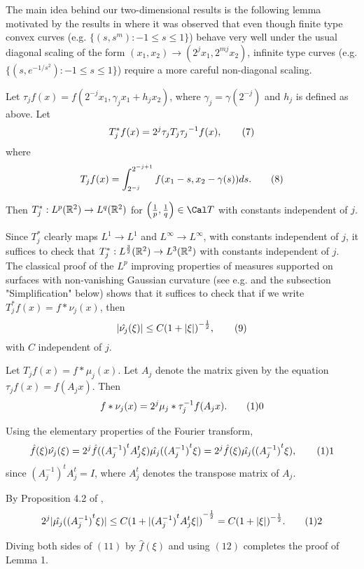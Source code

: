 The main idea behind our two-dimensional results is the following lemma 
motivated by the results in \cite{CCVWW89} where it was observed that 
even though finite type convex curves (e.g. $\{(s, s^m): -1 \leq s \leq 1\}$) 
behave very well under the usual diagonal scaling of the form 
$(x_1,x_2) \rightarrow
(2^jx_1, 2^{mj}x_2)$, infinite type curves (e.g. $\{(s, e^{-1/s^2}): 
-1 \leq s \leq 1\}$) require a more careful non-diagonal scaling.  

 Let $\tau_jf(x)=f(2^{-j}x_1, \gamma_jx_1+h_jx_2)$, 
where $\gamma_j=\gamma(2^{-j})$ and $h_j$ is defined as above. Let 
$$ T^{*}_jf(x)=2^j \tau_j T_j {\tau_j}^{-1}f(x), \tag7$$ where 
$$ T_jf(x)=\int_{2^{-j}}^{2^{-j+1}} f(x_1-s, x_2-\gamma(s))ds. \tag8$$ 

Then $T^{*}_j:L^p({\Bbb R}^2) \rightarrow L^q({\Bbb R}^2)$ for 
$\left(\frac{1}{p}, \frac{1}{q} \right)\in {\Cal T}$ with constants 
independent of $j$.
\endproclaim 

Since $T^{*}_j$ clearly maps $L^1 \rightarrow L^1$ and 
$L^{\infty} \rightarrow L^{\infty}$, with constants independent of $j$, 
it suffices to check that $T^{*}_j: L^{\frac{3}{2}}({\Bbb R}^2) \rightarrow
L^3({\Bbb R}^2)$ with constants independent of $j$. The classical proof 
of the $L^p$ improving properties of measures supported on surfaces with
non-vanishing Gaussian curvature (see e.g. \cite{Str70} and the subsection 
"Simplification" below) shows that it 
suffices to check that if we write $T^{*}_jf(x)=f*\nu_j(x)$, then 
$$ |\hat{\nu_j}(\xi)| \leq C{(1+|\xi|)}^{-\frac{1}{2}}, \tag9$$ with 
$C$ independent of $j$. \enddemo  

Let $T_jf(x)=f*\mu_j(x)$. Let $A_j$ denote the matrix given by the 
equation $\tau_jf(x)=f(A_jx)$. Then
$$ f*\nu_j(x)=2^j \mu_j*\tau^{-1}_jf(A_jx). \tag10$$ 

Using the elementary properties of the Fourier transform, 
$$ \hat{f}(\xi) \hat{\nu_j}(\xi)=2^j \hat{f}({(A_j^{-1})}^t A_j^t\xi) 
\hat{\mu_j}({(A_j^{-1})}^t\xi)=2^j\hat{f}(\xi) 
\hat{\mu_j}({(A_j^{-1})}^t\xi), \tag11$$ since 
${(A_j^{-1})}^t A_j^t=I$, where $A_j^t$ denotes the transpose matrix 
of $A_j$. 

By Proposition 4.2 of \cite{CCVWW89}, 
$$ 2^j|\hat{\mu_j}({(A_j^{-1})}^t\xi)| \leq C{(1+|{(A_j^{-1})}^t A_j^t\xi|)}
^{-\frac{1}{2}}=C{(1+|\xi|)}^{-\frac{1}{2}}. \tag12$$ 

Diving both sides of $(11)$ by $\hat{f}(\xi)$ and using $(12)$ completes the
proof of Lemma 1. 

